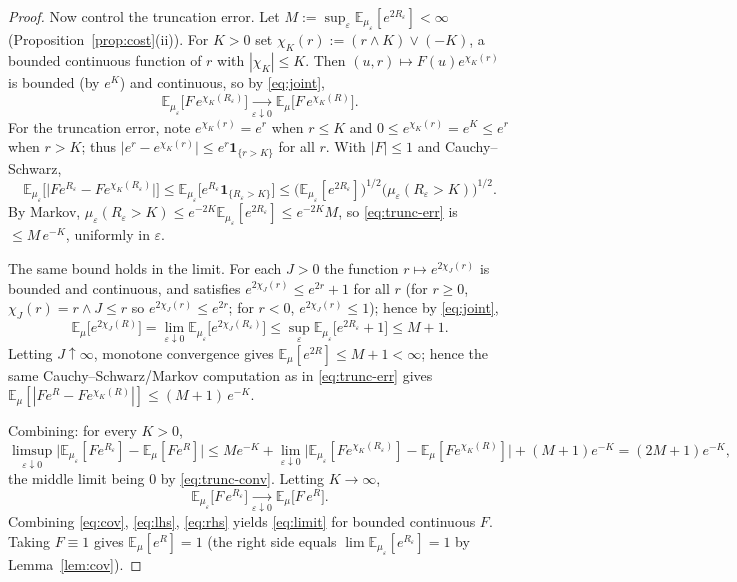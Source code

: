 \documentclass[12pt]{article}
\theoremstyle{definition}
\newcommand{\E}{\mathbb{E}}
\begin{document}
\begin{proof}
Now control the truncation error. Let
$M:=\sup_\varepsilon\E_{\mu_\varepsilon}[e^{2R_\varepsilon}]<\infty$
(Proposition~\ref{prop:cost}(ii)). For $K>0$ set $\chi_K(r):=(r\wedge K)\vee(-K)$, a
bounded continuous function of $r$ with $|\chi_K|\le K$. Then
$(u,r)\mapsto F(u)e^{\chi_K(r)}$ is bounded (by $e^K$) and continuous, so by
\eqref{eq:joint},
\begin{equation}\label{eq:trunc-conv}
  \E_{\mu_\varepsilon}\!\big[F\,e^{\chi_K(R_\varepsilon)}\big]
  \xrightarrow[\varepsilon\downarrow0]{}\E_\mu\!\big[F\,e^{\chi_K(R)}\big].
\end{equation}
For the truncation error, note $e^{\chi_K(r)}=e^{r}$ when $r\le K$ and
$0\le e^{\chi_K(r)}=e^K\le e^{r}$ when $r>K$; thus
$\big|e^{r}-e^{\chi_K(r)}\big|\le e^{r}\mathbf 1_{\{r>K\}}$ for all $r$. With $|F|\le1$ and
Cauchy--Schwarz,
\begin{equation}\label{eq:trunc-err}
  \E_{\mu_\varepsilon}\!\big[\big|F e^{R_\varepsilon}-F e^{\chi_K(R_\varepsilon)}\big|\big]
  \le\E_{\mu_\varepsilon}\!\big[e^{R_\varepsilon}\mathbf 1_{\{R_\varepsilon>K\}}\big]
  \le\big(\E_{\mu_\varepsilon}[e^{2R_\varepsilon}]\big)^{1/2}
     \big(\mu_\varepsilon(R_\varepsilon>K)\big)^{1/2}.
\end{equation}
By Markov, $\mu_\varepsilon(R_\varepsilon>K)\le e^{-2K}\E_{\mu_\varepsilon}[e^{2R_\varepsilon}]\le e^{-2K}M$,
so \eqref{eq:trunc-err} is $\le M\,e^{-K}$, uniformly in $\varepsilon$.

The same bound holds in the limit. For each $J>0$ the function $r\mapsto e^{2\chi_J(r)}$ is
bounded and continuous, and satisfies $e^{2\chi_J(r)}\le e^{2r}+1$ for all $r$ (for $r\ge0$,
$\chi_J(r)=r\wedge J\le r$ so $e^{2\chi_J(r)}\le e^{2r}$; for $r<0$, $e^{2\chi_J(r)}\le1$);
hence by \eqref{eq:joint},
\[
  \E_\mu\big[e^{2\chi_J(R)}\big]=\lim_{\varepsilon\downarrow0}\E_{\mu_\varepsilon}\big[e^{2\chi_J(R_\varepsilon)}\big]
   \le\sup_\varepsilon\E_{\mu_\varepsilon}\big[e^{2R_\varepsilon}+1\big]\le M+1 .
\]
Letting $J\uparrow\infty$, monotone convergence gives $\E_\mu[e^{2R}]\le M+1<\infty$;
hence the same Cauchy--Schwarz/Markov computation as in \eqref{eq:trunc-err} gives
$\E_\mu[|F e^{R}-F e^{\chi_K(R)}|]\le(M+1)\,e^{-K}$.

Combining: for every $K>0$,
\[
  \limsup_{\varepsilon\downarrow0}\Big|\E_{\mu_\varepsilon}[F e^{R_\varepsilon}]-\E_\mu[Fe^{R}]\Big|
  \le M e^{-K}
   +\lim_{\varepsilon\downarrow0}\Big|\E_{\mu_\varepsilon}[Fe^{\chi_K(R_\varepsilon)}]-\E_\mu[Fe^{\chi_K(R)}]\Big|
   +(M+1) e^{-K}
  =(2M+1) e^{-K},
\]
the middle limit being $0$ by \eqref{eq:trunc-conv}. Letting $K\to\infty$,
\begin{equation}\label{eq:rhs}
  \E_{\mu_\varepsilon}\!\big[F\,e^{R_\varepsilon}\big]\xrightarrow[\varepsilon\downarrow0]{}\E_\mu\!\big[F\,e^{R}\big].
\end{equation}
Combining \eqref{eq:cov}, \eqref{eq:lhs}, \eqref{eq:rhs} yields \eqref{eq:limit} for
bounded continuous $F$. Taking $F\equiv1$ gives $\E_\mu[e^R]=1$ (the right side equals
$\lim\E_{\mu_\varepsilon}[e^{R_\varepsilon}]=1$ by Lemma~\ref{lem:cov}).


\end{proof}
\end{document}
